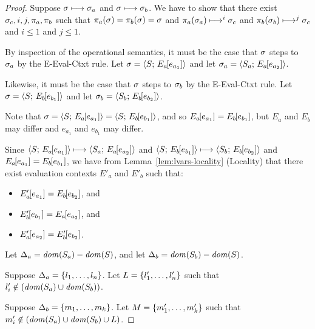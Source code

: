\begin{proof}
  Suppose $\sigma \longmapsto \sigma_a$ and $\sigma \longmapsto \sigma_b$.
  We have to show that there exist $\sigma_c, i, j, \pi_a, \pi_b$ such
  that $\pi_a(\sigma) = \pi_b(\sigma) = \sigma$ and $\pi_a(\sigma_a)
  \longmapsto^i \sigma_c$ and $\pi_b(\sigma_b) \longmapsto^j \sigma_c$
  and $i \leq 1$ and $j \leq 1$.

  By inspection of the operational semantics, it must be the case that
  $\sigma$ steps to $\sigma_a$ by the {\sc E-Eval-Ctxt} rule.  Let
  $\sigma = \langle S;\, E_a\hspace{-1mm}\left[e_{a_1}\right] \rangle$ and let $\sigma_a =
  \langle S_a;\, E_a\hspace{-1mm}\left[e_{a_2}\right] \rangle$.

  Likewise, it must be the case that $\sigma$ steps to $\sigma_b$ by the
  {\sc E-Eval-Ctxt} rule.  Let $\sigma =
  \langle S;\, E_b\hspace{-1mm}\left[e_{b_1}\right] \rangle$ and let $\sigma_b =
  \langle S_b;\, E_b\hspace{-1mm}\left[e_{b_2}\right] \rangle$.

  Note that $\sigma = \langle S;\, E_a\hspace{-1mm}\left[e_{a_1}\right] \rangle =
  \langle S;\, E_b\hspace{-1mm}\left[e_{b_1}\right] \rangle$, and so
  $E_a\hspace{-1mm}\left[e_{a_1}\right] = E_b\hspace{-1mm}\left[e_{b_1}\right]$, but $E_a$ and
  $E_b$ may differ and $e_{a_1}$ and $e_{b_1}$ may differ.

  Since $\langle S;\, E_a\hspace{-1mm}\left[e_{a_1}\right] \rangle \longmapsto
  \langle S_a;\, E_a\hspace{-1mm}\left[e_{a_2}\right] \rangle$ and
  $\langle S;\, E_b\hspace{-1mm}\left[e_{b_1}\right] \rangle \longmapsto
  \langle S_b;\, E_b\hspace{-1mm}\left[e_{b_2}\right] \rangle$ and $E_a\hspace{-1mm}\left[e_{a_1}\right]
  = E_b\hspace{-1mm}\left[e_{b_1}\right]$, we have from
  Lemma~\ref{lem:lvars-locality} (Locality) that there exist
  evaluation contexts $E'_a$ and $E'_b$ such that:

  \begin{itemize}
  \item $E'_a\hspace{-1mm}\left[e_{a_1}\right] = E_b\hspace{-1mm}\left[e_{b_2}\right]$, and
  \item $E'_b\hspace{-1mm}\left[e_{b_1}\right] = E_a\hspace{-1mm}\left[e_{a_2}\right]$, and
  \item $E'_a\hspace{-1mm}\left[e_{a_2}\right] =
  E'_b\hspace{-1mm}\left[e_{b_2}\right]$.
  \end{itemize}

  Let $\Delta_a = \mathit{dom}(S_a) - \mathit{dom}(S)$, and let $\Delta_b = \mathit{dom}(S_b)
  - \mathit{dom}(S)$.

  Suppose $\Delta_a = \left\{l_1, \dots, l_n\right\}$.  Let $L = \left\{l'_1,
    \dots, l'_n\right\}$ such that $l'_i \notin (\mathit{dom}(S_a) \cup \mathit{dom}(S_b))$.

  Suppose $\Delta_b = \left\{m_1, \dots, m_k\right\}$.  Let $M = \left\{m'_1,
    \dots, m'_k\right\}$ such that $m'_i \notin (\mathit{dom}(S_a) \cup \mathit{dom}(S_b)
  \cup L)$.


\end{proof}
